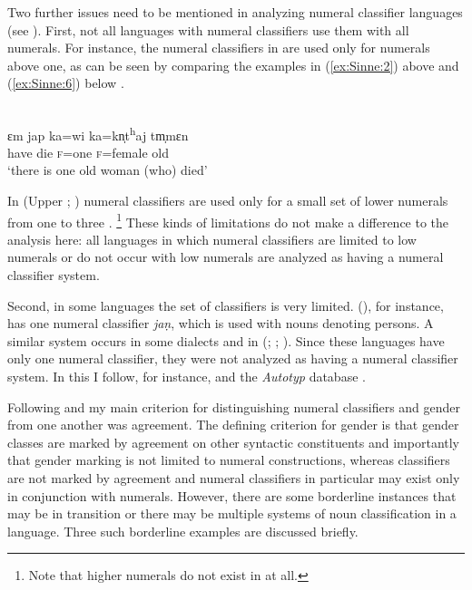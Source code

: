 \documentclass[output=collectionpaper]{langsci/langscibook}
\begin{document}
Two further issues need to be mentioned in analyzing numeral classifier languages (see \citealt{Gil2013}). First, not all languages with numeral classifiers use them with all numerals. For instance, the numeral classifiers in  are used only for numerals above one, as can be seen by comparing the examples in (\ref{ex:Sinne:2}) above and (\ref{ex:Sinne:6}) below \citep[108]{Ring2015}.

\ea\label{ex:Sinne:6}
\\
\gll ɛm jap ka=wi ka=kn̩t\textsuperscript{h}aj tm̩mɛn\\
have die \textsc{f=}one \textsc{f}=female old\\
\glt `there is one old woman (who) died'
\z

In  (Upper ; ) numeral classifiers are used only for a small set of lower numerals from one to three \citep[56--57]{Lock2011}.%
\footnote{Note that higher numerals do not exist in  at all.} %
These kinds of limitations do not make a difference to the analysis here: all languages in which numeral classifiers are limited to low numerals or do not occur with low numerals are analyzed as having a numeral classifier system.

Second, in some languages the set of classifiers is very limited.  (), for instance, has one numeral classifier \textit{jaṇ}, which is used with nouns denoting persons. A similar system occurs in some  dialects and in  (; ; \citealt[11--12]{Emeneau1956}). Since these languages have only one numeral classifier, they were not analyzed as having a numeral classifier system. In this I follow, for instance, \citet{Nichols1992} and the \textit{Autotyp} database \citep{Bickel2017}.

\largerpage
Following \citet[129, 132]{Nichols1992} and \citet[4--5]{Corbett1991} my main criterion for distinguishing numeral classifiers and gender from one another was agreement. The defining criterion for gender is that gender classes are marked by agreement on other syntactic constituents \textendash{} and importantly that gender marking is not limited to numeral constructions, whereas classifiers are not marked by agreement and numeral classifiers in particular may exist only in conjunction with numerals. However, there are some borderline instances that may be in transition or there may be multiple systems of noun classification in a language. Three such borderline examples are discussed briefly.
\end{document}
